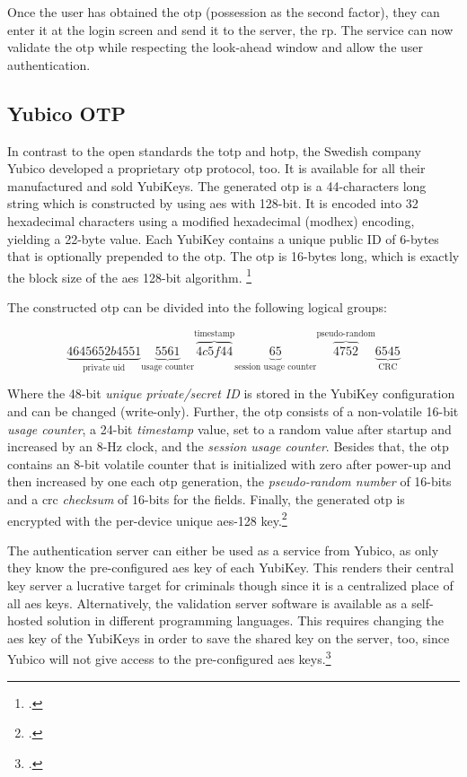 Once the user has obtained the \gls{otp} (possession as the second factor), they can enter it at the login screen and send it to the server, the \gls{rp}. The service can now validate the \gls{otp} while respecting the look-ahead window and allow the user authentication.

\subsection{Yubico OTP}

In contrast to the open standards the \gls{totp} and \gls{hotp}, the Swedish company Yubico developed a proprietary \gls{otp} protocol, too. It is available for all their manufactured and sold YubiKeys. The generated \gls{otp} is a 44-characters long string which is constructed by using \gls{aes} with 128-bit. It is encoded into 32 hexadecimal characters using a modified hexadecimal (\frqq modhex\flqq) encoding, yielding a 22-byte value. Each YubiKey contains a unique public ID of 6-bytes that is optionally prepended to the \gls{otp}. The \gls{otp} is 16-bytes long, which is exactly the block size of the \gls{aes} 128-bit algorithm. \footcites[][]{10.1007/978-3-642-38004-4_17}[See][84--86]{Jacobs:2016:STA:2953926.2953927}

The constructed \gls{otp} can be divided into the following logical groups:

\begin{equation*}
	\underbrace{4645652b4551}_\text{private uid}\underbrace{5561}_\text{usage counter}\overbrace{4c5f44}^\text{timestamp}\underbrace{65}_\text{session usage counter}\overbrace{4752}^\text{pseudo-random}\underbrace{6545}_\text{CRC}
\end{equation*}

Where the 48-bit \textit{unique private/secret ID} is stored in the YubiKey configuration and can be changed (write-only). Further, the \gls{otp} consists of a non-volatile 16-bit \textit{usage counter}, a 24-bit \textit{timestamp} value, set to a random value after startup and increased by an 8-Hz clock, and the \textit{session usage counter}. Besides that, the \gls{otp} contains an 8-bit volatile counter that is initialized with zero after power-up and then increased by one each \gls{otp} generation, the \textit{pseudo-random number} of 16-bits and a \gls{crc} \textit{checksum} of 16-bits for the fields. Finally, the generated \gls{otp} is encrypted with the per-device unique \gls{aes}-128 key.\footcites[See][8--9, 33--34]{yubico-otp}[See][209--210]{10.1007/978-3-642-41284-4_11}

The authentication server can either be used as a service from Yubico, as only they know the pre-configured \gls{aes} key of each YubiKey. This renders their central key server a lucrative target for criminals though since it is a centralized place of all \gls{aes} keys. Alternatively, the validation server software is available as a self-hosted solution in different programming languages. This requires changing the \gls{aes} key of the YubiKeys in order to save the shared key on the server, too, since Yubico will not give access to the pre-configured \gls{aes} keys.\footcites[See][8--9]{yubico-cloud}
